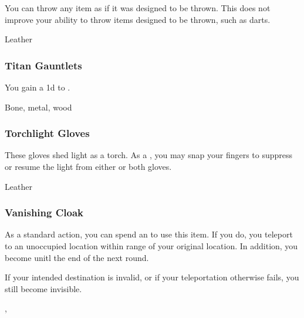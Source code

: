 You can throw any item as if it was designed to be thrown.
This does not improve your ability to throw items designed to be thrown, such as darts.



 Leather


\lowercase{\hypertarget{item:Titan Gauntlets}{}}\label{item:Titan Gauntlets}
\hypertarget{item:Titan Gauntlets}{\subsubsection{Titan Gauntlets\hfill{}}}

You gain a \plus1d  to .



 Bone, metal, wood


\lowercase{\hypertarget{item:Torchlight Gloves}{}}\label{item:Torchlight Gloves}
\hypertarget{item:Torchlight Gloves}{\subsubsection{Torchlight Gloves\hfill{}}}

These gloves shed light as a torch.
As a , you may snap your fingers to suppress or resume the light from either or both gloves.



 


 Leather


\lowercase{\hypertarget{item:Vanishing Cloak}{}}\label{item:Vanishing Cloak}
\hypertarget{item:Vanishing Cloak}{\subsubsection{Vanishing Cloak\hfill{}}}

As a standard action, you can spend an  to use this item.
If you do, you teleport to an unoccupied location within \rngmed range of your original location.
In addition, you become  unitl the end of the next round.

If your intended destination is invalid, or if your teleportation otherwise fails, you still become invisible.



 , 


